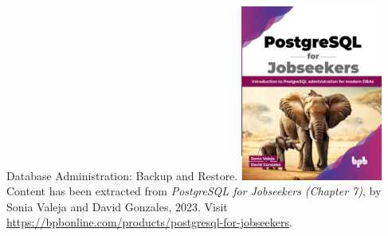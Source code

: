\documentclass[aspectratio=169]{beamer}
\begin{document}
\begin{frame}{Database Administration: Backup and Restore.}
    \centering
    \includegraphics[width=0.35\textwidth]{figures/book_cover}\\
    \vspace{2mm}
    {
        \scriptsize
        Content has been extracted from \textit{PostgreSQL for Jobseekers (Chapter 7)}, by Sonia Valeja and David Gonzales, 2023.  Visit \url{https://bpbonline.com/products/postgresql-for-jobseekers}.\\
    }
\end{frame}
\end{document}
